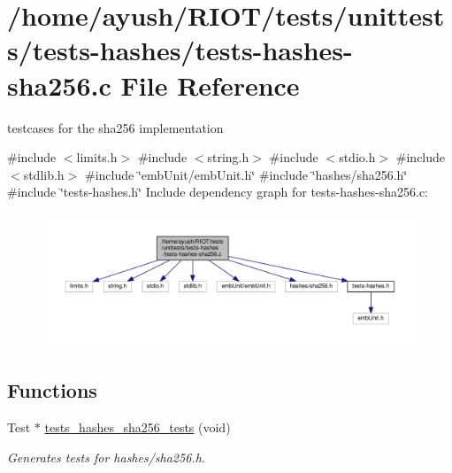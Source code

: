 \hypertarget{tests-hashes-sha256_8c}{}\section{/home/ayush/\+R\+I\+O\+T/tests/unittests/tests-\/hashes/tests-\/hashes-\/sha256.c File Reference}
\label{tests-hashes-sha256_8c}


testcases for the sha256 implementation  


{\ttfamily \#include $<$limits.\+h$>$}\newline
{\ttfamily \#include $<$string.\+h$>$}\newline
{\ttfamily \#include $<$stdio.\+h$>$}\newline
{\ttfamily \#include $<$stdlib.\+h$>$}\newline
{\ttfamily \#include \char`\"{}emb\+Unit/emb\+Unit.\+h\char`\"{}}\newline
{\ttfamily \#include \char`\"{}hashes/sha256.\+h\char`\"{}}\newline
{\ttfamily \#include \char`\"{}tests-\/hashes.\+h\char`\"{}}\newline
Include dependency graph for tests-\/hashes-\/sha256.c\+:
\nopagebreak
\begin{figure}[H]
\begin{center}
\leavevmode
\includegraphics[width=350pt]{tests-hashes-sha256_8c__incl}
\end{center}
\end{figure}
\subsection*{Functions}
\begin{DoxyCompactItemize}
\item 
Test $\ast$ \hyperlink{group__unittests_ga8bd7d0c07950195a3b10d69ec62d0be2}{tests\+\_\+hashes\+\_\+sha256\+\_\+tests} (void)
\begin{DoxyCompactList}\small\item\em Generates tests for hashes/sha256.\+h. \end{DoxyCompactList}\end{DoxyCompactItemize}


